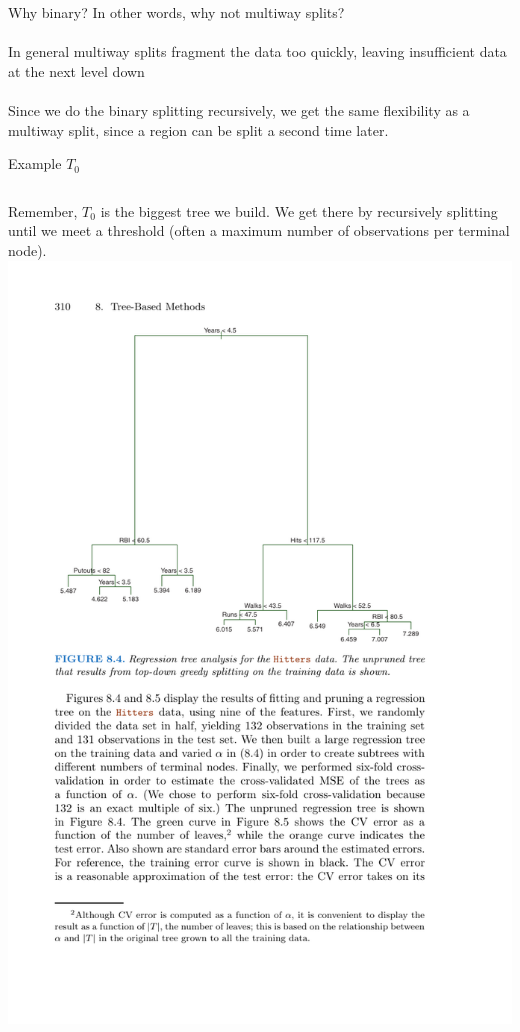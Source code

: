 \documentclass[mathserif, aspectratio=169]{beamer}
\begin{document}
\begin{frame}{Why binary?}
In other words, why not multiway splits?\\~\\

\pause
In general multiway splits fragment the data too quickly, leaving insufficient data at the next level down\\~\\

Since we do the binary splitting recursively, we get the same flexibility as a multiway split, since a region can be split a second time later.
\end{frame}

\begin{frame}{Example $T_0$}
\begin{columns}
Remember, $T_0$ is the biggest tree we build.  We get there by recursively splitting until we meet a threshold (often a maximum number of observations per terminal node).
\includegraphics[height=0.9\textheight]{complex_tree}

\end{columns}

\end{frame}
\end{document}
